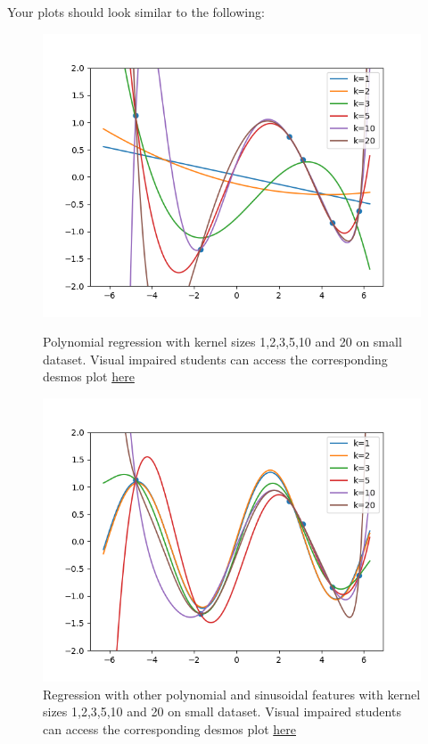 Your plots should look similar to the following:
\begin{figure}[H]
  \centering
  \includegraphics[width=0.65\linewidth]{02-featuremaps/small-poly.png}
  \caption{Polynomial regression with kernel sizes 1,2,3,5,10 and 20
  on small dataset. Visual impaired students can access the corresponding desmos plot \href{https://www.desmos.com/calculator/dwmvngfeyu}{here}}
  
  \centering
  \vspace{2mm}
  \includegraphics[width=0.65\linewidth]{02-featuremaps/small-sine.png}
  \centering
  \caption{Regression with other polynomial and sinusoidal features with kernel sizes 1,2,3,5,10 and 20
  on small dataset. Visual impaired students can access the corresponding desmos plot \href{https://www.desmos.com/calculator/wb7cepiy6y}{here}}
\end{figure}
